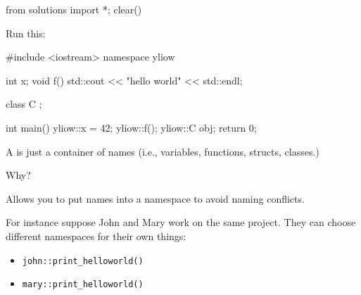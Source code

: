\begin{python0}
from solutions import *; clear()
\end{python0}

Run this:
\begin{console}
#include <iostream>
namespace yliow
{    
     int x;
     void f()
     {    
          std::cout << "hello world" <<
          std::endl;
     }
     
     class C
     {};
}

int main()
{   
    yliow::x = 42;
    yliow::f();
    yliow::C obj;
    return 0;
}
 
\end{console}

A  is just a container of names (i.e., variables, functions, structs, classes.)

Why?

Allows you to put names into a namespace to avoid naming conflicts.

For instance suppose John and Mary work on the same project. They can choose different namespaces for their own things:

\begin{itemize}
\item
  \verb!john::print_helloworld()!
\item
  \verb!mary::print_helloworld()!
\end{itemize}

